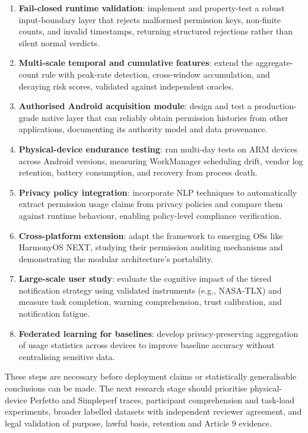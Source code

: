 \begin{enumerate}
    \item \textbf{Fail-closed runtime validation}: implement and property-test a robust input-boundary layer that rejects malformed permission keys, non-finite counts, and invalid timestamps, returning structured rejections rather than silent normal verdicts.
    \item \textbf{Multi-scale temporal and cumulative features}: extend the aggregate-count rule with peak-rate detection, cross-window accumulation, and decaying risk scores, validated against independent oracles.
    \item \textbf{Authorised Android acquisition module}: design and test a production-grade native layer that can reliably obtain permission histories from other applications, documenting its authority model and data provenance.
    \item \textbf{Physical-device endurance testing}: run multi-day tests on ARM devices across Android versions, measuring WorkManager scheduling drift, vendor log retention, battery consumption, and recovery from process death.
    \item \textbf{Privacy policy integration}: incorporate NLP techniques to automatically extract permission usage claims from privacy policies and compare them against runtime behaviour, enabling policy-level compliance verification.
    \item \textbf{Cross-platform extension}: adapt the framework to emerging OSs like HarmonyOS NEXT, studying their permission auditing mechanisms and demonstrating the modular architecture's portability.
    \item \textbf{Large-scale user study}: evaluate the cognitive impact of the tiered notification strategy using validated instruments (e.g., NASA-TLX) and measure task completion, warning comprehension, trust calibration, and notification fatigue.
    \item \textbf{Federated learning for baselines}: develop privacy-preserving aggregation of usage statistics across devices to improve baseline accuracy without centralising sensitive data.
\end{enumerate}

These steps are necessary before deployment claims or statistically generalisable conclusions can be made. The next research stage should prioritise physical-device Perfetto and Simpleperf traces, participant comprehension and task-load experiments, broader labelled datasets with independent reviewer agreement, and legal validation of purpose, lawful basis, retention and Article 9 evidence.

